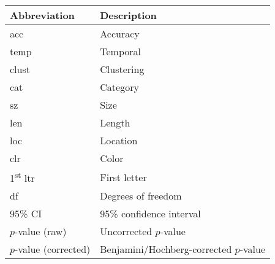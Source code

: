 \begin{tabular}{ll}
\toprule
             Abbreviation &                            Description \\
\midrule
                      acc &                               Accuracy \\
                     temp &                               Temporal \\
                    clust &                             Clustering \\
                      cat &                               Category \\
                       sz &                                   Size \\
                      len &                                 Length \\
                      loc &                               Location \\
                      clr &                                  Color \\
1\textsuperscript{st} ltr &                           First letter \\
                       df &                     Degrees of freedom \\
                  95\% CI &               95\% confidence interval \\
          $p$-value (raw) &                  Uncorrected $p$-value \\
    $p$-value (corrected) & Benjamini/Hochberg-corrected $p$-value \\
\bottomrule
\end{tabular}
